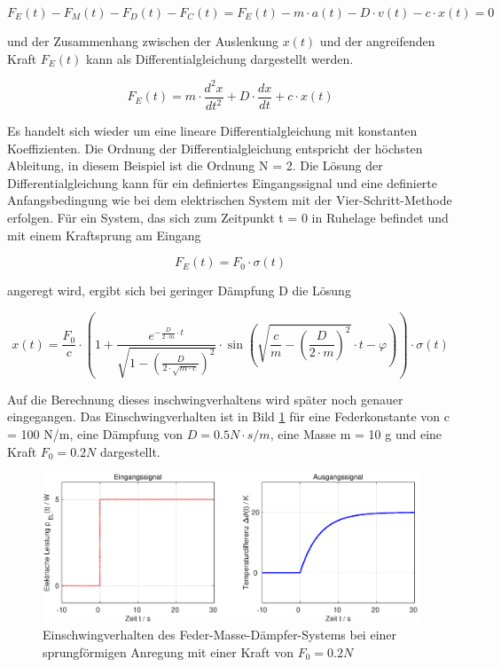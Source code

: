 \begin{equation}\label{eq:threetwentyone}
F_{E}(t)-F_{M}(t)-F_{D}(t)-F_{C}(t)=
F_{E}(t)-m\cdot a(t)-D\cdot v(t)-c\cdot x(t)=0
\end{equation}

\noindent und der Zusammenhang zwischen der Auslenkung $x(t)$ und der angreifenden Kraft $F_{E}(t)$ kann als Differentialgleichung dargestellt werden.

\begin{equation}\label{eq:threetwentytwo}
F_{E}(t)=m\cdot \frac{d^2x}{dt^2}+D\cdot \frac{dx}{dt}+c\cdot x(t)
\end{equation}

\noindent Es handelt sich wieder um eine lineare Differentialgleichung mit konstanten Koeffizienten. Die Ordnung der Differentialgleichung entspricht der höchsten Ableitung, in diesem Beispiel ist die Ordnung N = 2. Die Lösung der Differentialgleichung kann für ein definiertes Eingangssignal und eine definierte Anfangsbedingung wie bei dem elektrischen System mit der Vier-Schritt-Methode erfolgen. Für ein System, das sich zum Zeitpunkt t = 0 in Ruhelage befindet und mit einem Kraftsprung am Eingang

\begin{equation}\label{eq:threetwentythree}
F_{E}(t)=F_{0}\cdot \sigma(t)
\end{equation}

\noindent angeregt wird, ergibt sich bei geringer Dämpfung D die Lösung


\begin{equation}\label{eq:threetwentyfour}
x(t) = \frac{F_{0}}{c} \cdot \left(1+\frac{e^{-\frac{D}{2\cdot m} \cdot t} }{\sqrt{1-\left(\frac{D}{2\cdot \sqrt{m\cdot c} } \right)^{2} } } \cdot \sin \left(\sqrt{\frac{c}{m} -\left(\frac{D}{2\cdot m} \right)^{2} } \cdot t-\varphi \right)\right)\cdot \sigma \left(t\right)
\end{equation}

\noindent Auf die Berechnung dieses  inschwingverhaltens wird später noch genauer eingegangen. Das Einschwingverhalten ist in Bild \ref{fig:AusblendeigenschaftImpulsfunktion} für eine Federkonstante von c = 100 N/m, eine Dämpfung von $D = 0.5 N\cdot s/m$, eine Masse m = 10 g und eine Kraft $F_{0}= 0.2 N$  dargestellt.

\begin{figure}[ht]
  \centerline{\includegraphics[width=1\textwidth]{Kapitel2/Bilder/image5}}
  \caption{Einschwingverhalten des Feder-Masse-Dämpfer-Systems bei einer sprungförmigen Anregung mit einer Kraft von $F_{0}= 0.2 N$}
  \label{fig:AusblendeigenschaftImpulsfunktion}
\end{figure}

